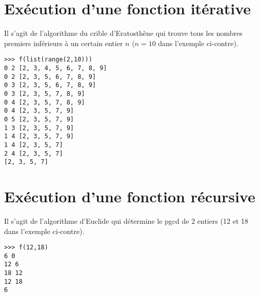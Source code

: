 \documentclass[11pt,a4paper]{article}
\begin{document}
\section{Exécution d'une fonction itérative}
%

\begin{minipage}[t]{8cm}
Il s'agit de l'algorithme du crible d'Eratosthène qui trouve 
tous les nombres premiers inférieurs à un certain entier $n$
($n=10$ dans l'exemple ci-contre).
\end{minipage}
\hfill
\begin{py}{6cm}
\begin{verbatim}
>>> f(list(range(2,10)))
0 2 [2, 3, 4, 5, 6, 7, 8, 9]
0 2 [2, 3, 5, 6, 7, 8, 9]
0 3 [2, 3, 5, 6, 7, 8, 9]
0 3 [2, 3, 5, 7, 8, 9]
0 4 [2, 3, 5, 7, 8, 9]
0 4 [2, 3, 5, 7, 9]
0 5 [2, 3, 5, 7, 9]
1 3 [2, 3, 5, 7, 9]
1 4 [2, 3, 5, 7, 9]
1 4 [2, 3, 5, 7]
2 4 [2, 3, 5, 7]
[2, 3, 5, 7]
\end{verbatim}
\end{py}

\section{Exécution d'une fonction récursive}
%

\begin{minipage}[t]{8cm}
Il s'agit de l'algorithme d'Euclide qui détermine le pgcd de 2 entiers
(12 et 18 dans l'exemple ci-contre).
\end{minipage}
\hfill
\begin{py}{6cm}
\begin{verbatim}
>>> f(12,18)
6 0
12 6
18 12
12 18
6
\end{verbatim}
\end{py}

\label{fini}
\end{document}

